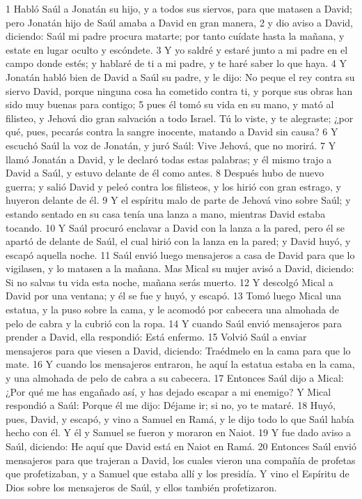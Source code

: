 1 Habló Saúl a Jonatán su hijo, y a todos sus siervos, para que matasen a David; pero Jonatán hijo de Saúl amaba a David en gran manera,
2 y dio aviso a David, diciendo: Saúl mi padre procura matarte; por tanto cuídate hasta la mañana, y estate en lugar oculto y escóndete.
3 Y yo saldré y estaré junto a mi padre en el campo donde estés; y hablaré de ti a mi padre, y te haré saber lo que haya.
4 Y Jonatán habló bien de David a Saúl su padre, y le dijo: No peque el rey contra su siervo David, porque ninguna cosa ha cometido contra ti, y porque sus obras han sido muy buenas para contigo;
5 pues él tomó su vida en su mano, y mató al filisteo, y Jehová dio gran salvación a todo Israel. Tú lo viste, y te alegraste; ¿por qué, pues, pecarás contra la sangre inocente, matando a David sin causa?
6 Y escuchó Saúl la voz de Jonatán, y juró Saúl: Vive Jehová, que no morirá.
7 Y llamó Jonatán a David, y le declaró todas estas palabras; y él mismo trajo a David a Saúl, y estuvo delante de él como antes.
8 Después hubo de nuevo guerra; y salió David y peleó contra los filisteos, y los hirió con gran estrago, y huyeron delante de él.
9 Y el espíritu malo de parte de Jehová vino sobre Saúl; y estando sentado en su casa tenía una lanza a mano, mientras David estaba tocando. 
10 Y Saúl procuró enclavar a David con la lanza a la pared, pero él se apartó de delante de Saúl, el cual hirió con la lanza en la pared; y David huyó, y escapó aquella noche.
11 Saúl envió luego mensajeros a casa de David para que lo vigilasen, y lo matasen a la mañana. Mas Mical su mujer avisó a David, diciendo: Si no salvas tu vida esta noche, mañana serás muerto.
12 Y descolgó Mical a David por una ventana; y él se fue y huyó, y escapó.
13 Tomó luego Mical una estatua, y la puso sobre la cama, y le acomodó por cabecera una almohada de pelo de cabra y la cubrió con la ropa.
14 Y cuando Saúl envió mensajeros para prender a David, ella respondió: Está enfermo.
15 Volvió Saúl a enviar mensajeros para que viesen a David, diciendo: Traédmelo en la cama para que lo mate.
16 Y cuando los mensajeros entraron, he aquí la estatua estaba en la cama, y una almohada de pelo de cabra a su cabecera.
17 Entonces Saúl dijo a Mical: ¿Por qué me has engañado así, y has dejado escapar a mi enemigo? Y Mical respondió a Saúl: Porque él me dijo: Déjame ir; si no, yo te mataré.
18 Huyó, pues, David, y escapó, y vino a Samuel en Ramá, y le dijo todo lo que Saúl había hecho con él. Y él y Samuel se fueron y moraron en Naiot.
19 Y fue dado aviso a Saúl, diciendo: He aquí que David está en Naiot en Ramá.
20 Entonces Saúl envió mensajeros para que trajeran a David, los cuales vieron una compañía de profetas que profetizaban, y a Samuel que estaba allí y los presidía. Y vino el Espíritu de Dios sobre los mensajeros de Saúl, y ellos también profetizaron.
